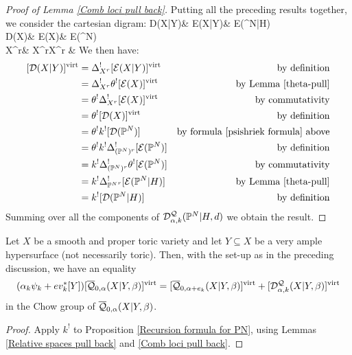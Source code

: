 \begin{proof}[Proof of Lemma \ref{Comb loci pull back}] Putting all the preceding results together, we consider the cartesian digram:
\bcd
\mathcal D(X|Y)\ar[d]\ar[r] & \mathcal E(X|Y)\ar[d]\ar[r] & \mathcal E(\PP^N|H)\ar[d,"\theta"] \\
\mathcal D(X)\ar[d]\ar[r] & \mathcal E(X)\ar[d]\ar[r] & \mathcal E(\PP^N) \\
X^r\ar[r,"\Delta_{X^r}"] & X^r\times X^r & {}
\ecd
We then have:
\begin{align*} [\mathcal D(X|Y)]^{\operatorname{virt}} & = \Delta_{X^r}^! [\mathcal E(X|Y)]^{\operatorname{virt}} & \text{by definition}\\
& =  \Delta_{X^r}^! \theta^![\mathcal E(X)]^{\operatorname{virt}} & \text{by Lemma \ref{theta-pull}} \\
& =  \theta^!\Delta_{X^r}^! [\mathcal E(X)]^{\operatorname{virt}} & \text{by commutativity} \\
& =  \theta^! [\mathcal{D}(X)]^{\operatorname{virt}} & \text{by definition} \\
& =  \theta^!k^! [\mathcal{D}(\mathbb P^N)] & \text{by formula \eqref{psishriek formula} above} \\
& =  \theta^!k^!\Delta_{(\mathbb P^N)^r}^! [\mathcal E(\mathbb P^N)] & \text{by definition} \\
& =  k^!\Delta_{(\mathbb P^N)^r}^!\theta^! [\mathcal E(\mathbb P^N)] & \text{by commutativity} \\
& = k^! \Delta_{{\mathbb P^N}^r}^! [\mathcal{E}(\mathbb P^N|H)] & \text{by Lemma \ref{theta-pull}} \\
& =  k^![\mathcal{D}(\mathbb P^N|H)] & \text{by definition}
\end{align*}
Summing over all the components of $\mathcal{D}^{\mathcal{Q}}_{\alpha,k}(\mathbb P^N|H,d)$ we obtain the result. \end{proof}

\begin{thm} \label{Theorem general recursion} Let $X$ be a smooth and proper toric variety and let $Y \subseteq X$ be a very ample hypersurface (not necessarily toric). Then, with the set-up as in the preceding discussion, we have an equality
\begin{equation*} (\alpha_k \psi_k + ev_k^* [Y]) [\overline{\mathcal Q}_{0,\alpha}(X|Y,\beta)]^{\operatorname{virt}} = [\overline{\mathcal Q}_{0,\alpha+e_k}(X|Y,\beta)]^{\operatorname{virt}} + [\mathcal D^\mathcal{Q}_{\alpha,k}(X|Y,\beta)]^{\operatorname{virt}} \end{equation*}
in the Chow group of $\overline{\mathcal Q}_{0,\alpha}(X|Y,\beta)$. \end{thm}
\begin{proof} Apply $k^!$ to Proposition \ref{Recursion formula for PN}, using Lemmas \ref{Relative spaces pull back} and \ref{Comb loci pull back}. \end{proof}